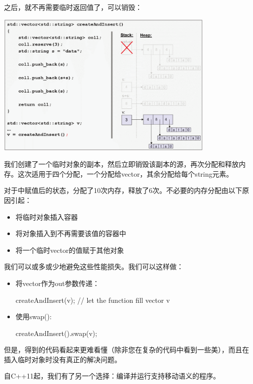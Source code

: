 \begin{itemize}
\begin{center}
	\end{center}
	之后，就不再需要临时返回值了，可以销毁：
\begin{center}
		\includegraphics[width=0.8\textwidth]{part1/ch1/images/9}
	\end{center}
	我们创建了一个临时对象的副本，然后立即销毁该副本的源，再次分配和释放内存。这次适用于四个分配，一个分配给vector，其余分配给每个string元素。
\end{itemize}

对于中赋值后的状态，分配了10次内存，释放了6次。不必要的内存分配由以下原因引起：

\begin{itemize}
	\item 将临时对象插入容器
	\item 将对象插入到不再需要该值的容器中
	\item 将一个临时vector的值赋于其他对象
\end{itemize}

我们可以或多或少地避免这些性能损失。我们可以这样做：

\begin{itemize}
	\item 将vector作为out参数传递：
\begin{cppcode}
createAndInsert(v); // let the function fill vector v
\end{cppcode}
	\item 使用swap():
\begin{cppcode}
createAndInsert().swap(v);
\end{cppcode}
\end{itemize}

但是，得到的代码看起来更难看懂（除非您在复杂的代码中看到一些美），而且在插入临时对象时没有真正的解决问题。

自C++11起，我们有了另一个选择：编译并运行支持移动语义的程序。

